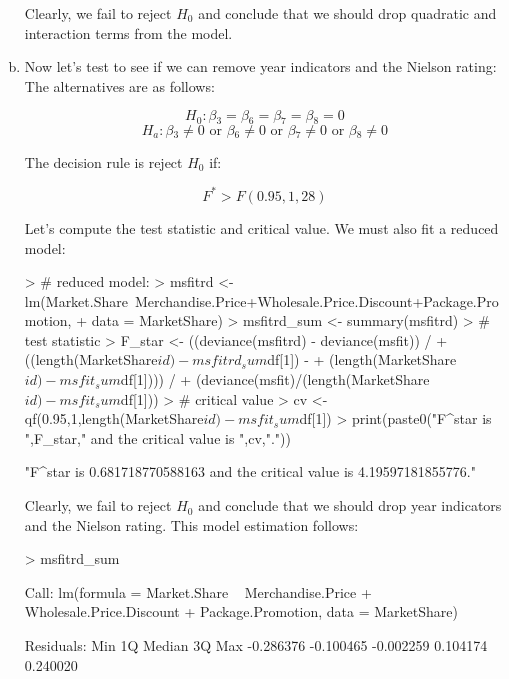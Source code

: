 \documentclass{article}
\begin{document}
\begin{enumerate}[a)]
Clearly, we fail to reject $H_0$ and conclude that we should drop quadratic and interaction terms from the model.

\item{} Now let's test to see if we can remove year indicators and the Nielson rating: The alternatives are as follows:

$$ H_0: \beta{}_3 = \beta{}_6 = \beta{}_7 = \beta{}_8 = 0 $$
$$ H_a: \beta{}_3 \neq{} 0 \text{ or } \beta{}_6 \neq{} 0 \text{ or } \beta{}_7 \neq{} 0 \text{ or } \beta{}_8 \neq{} 0$$

The decision rule is reject $H_0$ if:

$$ F^* > F(0.95,1,28) $$

Let's compute the test statistic and critical value. We must also fit a reduced model:

\begin{Schunk}
\begin{Sinput}
> # reduced model:
> msfitrd <- lm(Market.Share~Merchandise.Price+Wholesale.Price.Discount+Package.Promotion,
+             data = MarketShare)
> msfitrd_sum <- summary(msfitrd)
> # test statistic
> F_star <- ((deviance(msfitrd) - deviance(msfit)) /
+   ((length(MarketShare$id) - msfitrd_sum$df[1]) - 
+      (length(MarketShare$id) - msfit_sum$df[1]))) /
+   (deviance(msfit)/(length(MarketShare$id) - msfit_sum$df[1]))
> # critical value
> cv <- qf(0.95,1,length(MarketShare$id)-msfit_sum$df[1])
> print(paste0("F^star is ",F_star," and the critical value is ",cv,"."))
\end{Sinput}
\begin{Soutput}
[1] "F^star is 0.681718770588163 and the critical value is 4.19597181855776."
\end{Soutput}
\end{Schunk}

Clearly, we fail to reject $H_0$ and conclude that we should drop year indicators and the Nielson rating. This model estimation follows:

\begin{Schunk}
\begin{Sinput}
> msfitrd_sum
\end{Sinput}
\begin{Soutput}
Call:
lm(formula = Market.Share ~ Merchandise.Price + Wholesale.Price.Discount + 
    Package.Promotion, data = MarketShare)

Residuals:
      Min        1Q    Median        3Q       Max 
-0.286376 -0.100465 -0.002259  0.104174  0.240020 


\end{Soutput}
\end{Schunk}
\end{enumerate}
\end{document}
